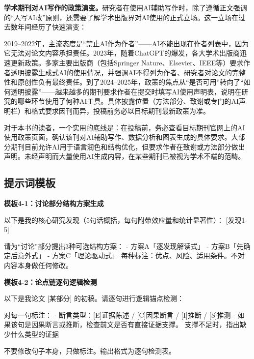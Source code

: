 \begin{funbox}
\textbf{学术期刊对AI写作的政策演变。}研究者在使用AI辅助写作时，除了遵循正文强调的``人写AI改''原则，还需要了解学术出版界对AI使用的正式立场。这一立场在过去数年间经历了快速演变：

2019--2022年，主流态度是``禁止AI作为作者''——AI不能出现在作者列表中，因为它无法对论文内容承担责任。2023年，随着ChatGPT的爆发，各大学术出版商迅速更新政策。多家主要出版商（包括Springer Nature、Elsevier、IEEE等）要求作者透明披露生成式AI的使用情况，并强调AI不得列为作者、研究者对论文的完整性和原创性负有最终责任。到了2024--2025年，政策的焦点从``是否可用''转向了``如何透明披露''——越来越多的期刊要求作者在提交时填写AI使用声明表，说明在研究的哪些环节使用了何种AI工具。具体披露位置（方法部分、致谢或专门的AI声明栏）和格式要求因刊而异，投稿前务必以目标期刊最新政策为准。

对于本书的读者，一个实用的底线是：在投稿前，务必查看目标期刊官网上的AI使用政策页面，确认该刊对AI辅助写作、数据分析和图表生成的具体要求。大部分期刊目前允许AI用于语言润色和结构优化，但要求作者在致谢或方法部分做出声明。未经声明而大量使用AI生成内容，在某些期刊已被视为学术不端的范畴。
\end{funbox}


\subsection*{提示词模板}

\textbf{模板4-1：讨论部分结构方案生成}

\begin{tcolorbox}[promptbox]
以下是我的核心研究发现（5句话概括，每句附带效应量和统计显著性）：
[发现1-5]

请为``讨论''部分提出3种可选结构方案：
- 方案A「逐发现解读式」
- 方案B「先确定后意外式」
- 方案C「理论驱动式」
每种标注：优点、风险、适用条件。不对内容本身做任何修改。
\end{tcolorbox}

\textbf{模板4-2：论点链逐句逻辑检测}

\begin{tcolorbox}[promptbox]
以下是我论文 [某部分] 的初稿。请逐句进行逻辑锚点检测：

对每一句标注：
- 断言类型：[E]证据陈述 / [C]因果断言 / [I]推断 / [S]推测
- 如果该句是因果断言或推断，检查前文是否有直接证据支撑。
  支撑不足时，指出缺少什么类型的证据

不要修改句子本身，只做标注。输出格式为逐句检测表。
\end{tcolorbox}

